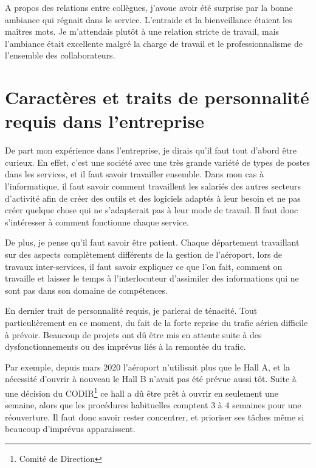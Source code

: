 A propos des relations entre collègues, j’avoue avoir été surprise par la bonne ambiance qui régnait dans le service. L’entraide et la bienveillance étaient les maîtres mots. Je m’attendais plutôt à une relation stricte de travail, mais l’ambiance était excellente malgré la charge de travail et le professionnalisme de l’ensemble des collaborateurs.


\section{Caractères et traits de personnalité requis dans l'entreprise}

De part mon expérience dans l'entreprise, je dirais qu'il faut tout d'abord être curieux. En effet, c'est une société avec une très grande variété de types de postes dans les services, et il faut savoir travailler ensemble.
Dans mon cas à l'informatique, il faut savoir comment travaillent les salariés des autres secteurs d'activité afin de créer des outils et des logiciels adaptés à leur besoin et ne pas créer quelque chose qui ne s'adapterait pas à leur mode de travail.
Il faut donc s'intéresser à comment fonctionne chaque service.\newline

De plus, je pense qu'il faut savoir être patient. Chaque département travaillant sur des aspects complètement différents de la gestion de l'aéroport, lors de travaux inter-services, il faut savoir expliquer ce que l'on fait, comment on travaille et laisser le temps à l'interlocuteur d'assimiler des informations qui ne sont pas dans son domaine de compétences.\newline

En dernier trait de personnalité requis, je parlerai de ténacité. Tout particulièrement en ce moment, du fait de la forte reprise du trafic aérien difficile à prévoir. Beaucoup de projets ont dû être mis en attente suite à des dysfonctionnements ou des imprévus liés à la remontée du trafic.

Par exemple, depuis mars 2020 l’aéroport n’utilisait plus que le Hall A, et la nécessité d’ouvrir à nouveau le Hall B n’avait pas été prévue aussi tôt. Suite à une décision du CODIR\footnote{Comité de Direction} ce hall a dû être prêt à ouvrir en seulement une semaine, alors que les procédures habituelles comptent 3 à 4 semaines pour une réouverture. Il faut donc savoir rester concentrer, et prioriser ses tâches même si beaucoup d'imprévus apparaissent.

\newpage

